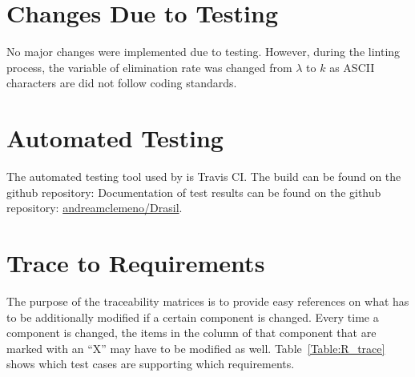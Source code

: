 \documentclass[12pt, titlepage]{article}
\begin{document}
\section{Changes Due to Testing}\label{changes}

No major changes were implemented due to testing. However, during the linting 
process, the variable of elimination rate was changed from $\lambda$ to $k$ as 
ASCII characters are did not follow coding standards.

\section{Automated Testing}\label{autotesting}

The automated testing tool used by \progname{} is Travis CI. The build can be 
found on the github repository: Documentation of test results can be found on 
the github repository: 
\href{https://github.com/andreamclemeno/Drasil}{andreamclemeno/Drasil}.

		
\section{Trace to Requirements}


The purpose of the traceability matrices is to provide easy references on what
has to be additionally modified if a certain component is changed.  Every time a
component is changed, the items in the column of that component that are marked
with an ``X'' may have to be modified as well.  Table~\ref{Table:R_trace} shows 
which test cases are supporting which requirements.
\end{document}
